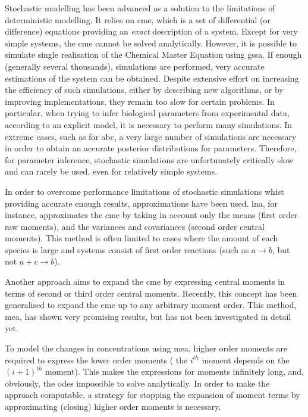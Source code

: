 Stochastic modelling has been advanced as a solution to the limitations of deterministic modelling.
It relies on \gls{cme}, which is a set of differential (or difference) equations providing an \emph{exact} description of a system\cite{kampen_stochastic_2011}.
Except for very simple systems, the \gls{cme} cannot be solved analytically.
However, it is possible to simulate single realisation of the Chemical Master Equation using \gls{gssa}.
If enough (generally several thousands), simulations are performed, very accurate estimations of the system can be obtained.
Despite extensive effort on increasing the efficiency of such simulations, either by describing new algorithms, or by improving implementations,
they remain too slow for certain problems.
In particular, when trying to infer biological parameters from experimental data, according to an explicit model,
it is necessary to perform many simulations.
In extreme cases, such as for \gls{abc}\cite{toni_approximate_2009}, a very large number of simulations are necessary in order to obtain an 
accurate posterior distributions for parameters.
Therefore, for parameter inference, stochastic simulations are unfortunately critically slow and can rarely be used, even for relatively simple systems.

In order to overcome performance limitations of stochastic simulations whist providing accurate enough results, approximations have been used.
\Gls{lna}, for instance, approximates the \gls{cme}
by taking in account only the means (first order raw moments), and the variances and covariances (second order central moments)\cite{komorowski_bayesian_2009}.
This method is often limited to cases where the amount of each species is large and systems consist of first order reactions
(such as  $a \rightarrow b$, but not $a + c  \rightarrow b$)\cite{ale_general_2013}.

Another approach aims to expand the \gls{cme} by expressing central moments in terms of second or third order central moments\cite{gillespie_moment-closure_2009, gomez-uribe_mass_2007}.
Recently, this concept has been generalised to expand the \gls{cme} up to any arbitrary moment order\cite{ale_general_2013}.
This method, \gls{mea}, has shown very promising results, but has not been investigated in detail yet.

To model the changes in concentrations using \gls{mea}, higher order moments are required to express the lower order moments
(\ie{} the $i^{th}$ moment depends on the $(i+1)^{th}$ moment).
This makes the expressions for moments infinitely long, and, obviously, the \glspl{ode} impossible to solve analytically. In order to make the approach computable, a strategy for stopping the
expansion of moment terms by approximating (closing) higher order moments is necessary.

